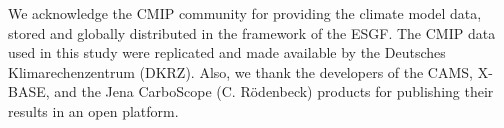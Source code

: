 \documentclass[ProofPDF]{./Styles/Jnls-Template-V3}
\begin{document}








\begin{acknowledgements}[Acknowledgements]
We acknowledge the CMIP community for providing the climate model data, stored and globally distributed in the framework of the ESGF. The CMIP data used in this study were replicated and made available by the Deutsches Klimarechenzentrum (DKRZ). Also, we thank the developers of the CAMS, X-BASE, and the Jena CarboScope (C. Rödenbeck) products for publishing their results in an open platform.

\end{acknowledgements}

\appendix
\end{document}
